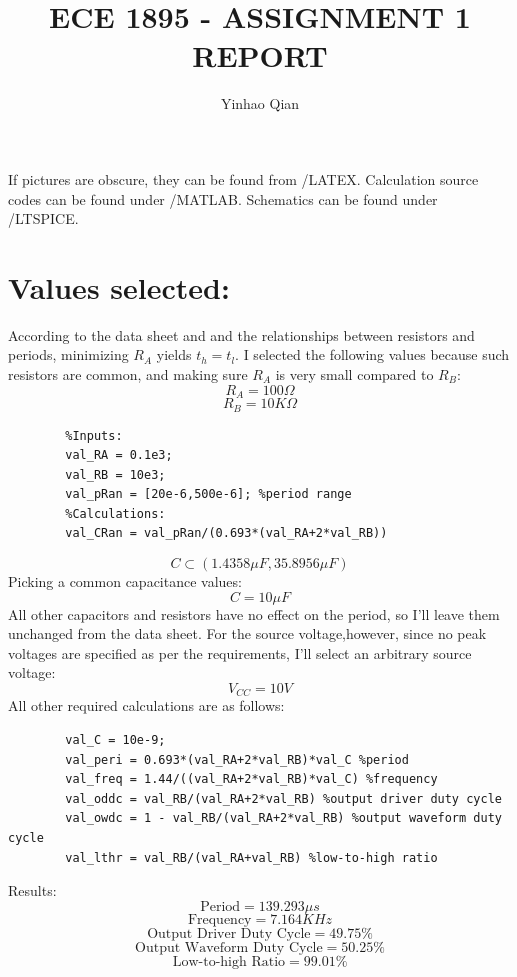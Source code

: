 \documentclass{article}
\title{ECE 1895 - ASSIGNMENT 1 REPORT}
\author{Yinhao Qian}
\begin{document}
	\maketitle
	If pictures are obscure, they can be found from /LATEX. 
	Calculation source codes can be found under /MATLAB.
	Schematics can be found under /LTSPICE.
	\section*{Values selected:}
	According to the data sheet and and the relationships between resistors and periods, minimizing $R_A$ yields $t_h=t_l$. I selected the following values because such resistors are common, and making sure $R_A$ is very small compared to $R_B$:
	\[R_A=100\Omega\]
	\[R_B=10K\Omega\]
	\begin{verbatim}
		%Inputs:
		val_RA = 0.1e3;
		val_RB = 10e3;
		val_pRan = [20e-6,500e-6]; %period range
		%Calculations:
		val_CRan = val_pRan/(0.693*(val_RA+2*val_RB))
	\end{verbatim}
	\[C\subset(1.4358\mu F,35.8956\mu F)\]
	Picking a common capacitance values:
	\[C=10\mu F\]
	All other capacitors and resistors have no effect on the period, so I'll leave them unchanged from the data sheet. For the source voltage,however, since no peak voltages are specified as per the requirements, I'll select an arbitrary source voltage:
	\[V_{CC}=10V\]
	All other required calculations are as follows:
	\begin{verbatim}
		val_C = 10e-9;
		val_peri = 0.693*(val_RA+2*val_RB)*val_C %period
		val_freq = 1.44/((val_RA+2*val_RB)*val_C) %frequency
		val_oddc = val_RB/(val_RA+2*val_RB) %output driver duty cycle
		val_owdc = 1 - val_RB/(val_RA+2*val_RB) %output waveform duty cycle
		val_lthr = val_RB/(val_RA+val_RB) %low-to-high ratio
	\end{verbatim}
	Results:
	\[\mbox{Period}=139.293\mu s\]
	\[\mbox{Frequency}=7.164KHz\]
	\[\mbox{Output Driver Duty Cycle}=49.75\%\]
	\[\mbox{Output Waveform Duty Cycle}=50.25\%\]
	\[\mbox{Low-to-high Ratio}=99.01\%\]
\end{document}
